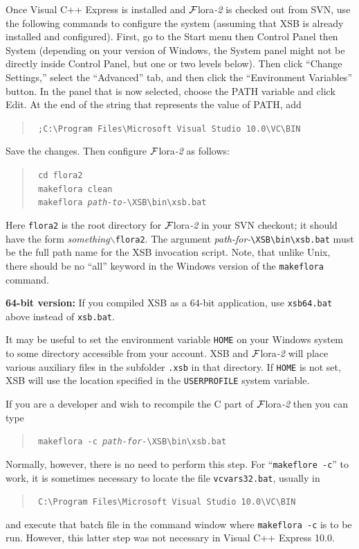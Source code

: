 \documentclass[11pt]{article}
\newcommand{\FLORA}{{\mbox{\sc ${\cal F}${lora}\rm\emph{-2}}}\xspace}
\newcommand{\FLSYSTEM}{\FLORA}
\newcommand{\bs}{\textbackslash}
\begin{document}
{Once Visual C++ Express is installed and \FLSYSTEM is checked out from SVN,
use the following commands to configure
the system (assuming that XSB is already installed and configured).
First, go to the Start menu then Control Panel then System (depending on your
version of Windows, the System panel might not be directly inside Control
Panel, but one or two levels below). Then click ``Change Settings,'' select
the ``Advanced'' tab, and then click the ``Environment Variables'' button.
In the panel that is now selected,
choose the PATH variable and click Edit. At the end of the string that
represents the value of PATH, add
\begin{quote}
  \tt
 ;C:{\bs}Program Files{\bs}Microsoft Visual Studio 10.0{\bs}VC{\bs}BIN
\end{quote}
Save the changes. 
Then configure \FLSYSTEM as follows:
\begin{quote}
  \tt
   cd flora2\\
   \tt
   makeflora clean\\
   \tt
   makeflora \textnormal{\emph{path-to-}}{\bs}XSB{\bs}bin{\bs}xsb.bat
\end{quote}
Here \texttt{flora2}  is the root directory 
for \FLSYSTEM in your SVN checkout; it should have the form
\emph{something}$\backslash${\tt flora2}. The argument
\textnormal{\emph{path-for-}}\texttt{{\bs}XSB{\bs}bin{\bs}xsb.bat}
must be the full path name for the XSB invocation script.
Note, that unlike Unix, there should be no ``all'' keyword
in the Windows version of the \texttt{makeflora} command.

\noindent
\textbf{64-bit version:}  
If you compiled XSB as a 64-bit application, use \texttt{xsb64.bat} above instead of
\texttt{xsb.bat}.  

It may be useful to set the environment variable \texttt{HOME}
on your Windows
system to some directory accessible from your account. XSB and \FLSYSTEM
will place
various auxiliary files in the subfolder \texttt{.xsb}  in that
directory.
If \texttt{HOME}  is
not set,
XSB will use the location specified in the \texttt{USERPROFILE}
system variable.

If you are a developer and wish to recompile the C part of \FLSYSTEM
then you can type
\begin{quote}
\tt
   makeflora -c \textnormal{\emph{path-for-}}{\bs}XSB{\bs}bin{\bs}xsb.bat
\end{quote}
Normally, however, there is no need to perform this step.
For ``\texttt{makeflore -c}'' to work,  
it is sometimes necessary to locate the file
{\tt vcvars32.bat},
usually in
\begin{quote}
  \tt
 C:{\bs}Program Files{\bs}Microsoft Visual Studio 10.0{\bs}VC{\bs}BIN 
\end{quote}
and execute that batch file
in the command window where \texttt{makeflora -c} is to be
run. However, this latter step was not necessary in Visual
C++ Express 10.0.

}
\end{document}
